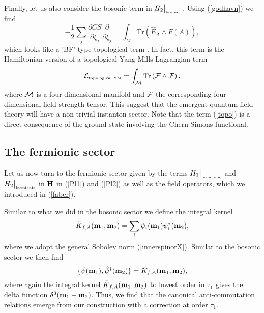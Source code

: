 \documentclass[12pt]{article}
\def\d{\delta}
\def\cf{{\cal F}}
\def\cl{{\cal L}}
\def\cm{{\cal M}}
\newcommand{\pa}{\partial}
\begin{document}
Finally, let us also consider the bosonic term in $H_2\big\vert_{\mbox{\tiny bosonic}}$.  Using (\ref{godhavn})  we find
\begin{equation}
-\frac{1}{2}\sum_j \frac{\pa CS}{\pa \xi_j}   \frac{\pa }{\pa \xi_j}  = \int_M \mbox{Tr} \left( \hat{E}_A \wedge F(A) \right),
\label{topo}
\end{equation}
which looks like a 'BF'-type topological term \cite{Birmingham}. In fact, this term is the Hamiltonian version of a topological Yang-Mills Lagrangian term \cite{Witten:1988ze} 
$$
\cl_{\mbox{\tiny topological YM}} = \int_{\cm}\mbox{Tr} \left( \cf \wedge \cf \right),
$$
where $\cm$ is a four-dimensional manifold and $\cf$ the corresponding four-dimensional field-strength tensor. This suggest that the emergent quantum field theory will have a non-trivial instanton sector. Note that the term (\ref{topo}) is a direct consequence of the ground state involving the Chern-Simons functional. 





\subsection{The fermionic sector }


Let us now turn to the fermionic sector given by the terms $H_1\big\vert_{\mbox{\tiny fermionic}}$ and $H_2\big\vert_{\mbox{\tiny fermionic}}$ in ${\bf H}$ in (\ref{Pl1}) and (\ref{Pl2}) as well as the field operators, which we introduced in (\ref{faber}). 

Similar to what we did in the bosonic sector we define the integral kernel
\begin{equation}
\tilde{K}_{f,A}({\bf m}_1,{\bf m}_2)= \sum_i \psi_i({\bf m}_1)\psi^*_i({\bf m}_2),
\label{Capetown}
\end{equation}
where we adopt the general Sobolev norm (\ref{innerspinorX}). Similar to the bosonic sector  we then find
\begin{equation}
\{ \hat{\psi} ({\bf m}_1) ,   \hat{{\psi}}^\dagger ({\bf m}_2) \} = \tilde{K}_{f,A}({\bf m}_1,{\bf m}_2),
\label{Fermionic}
\end{equation}
where again the integral kernel $\tilde{K}_{f,A}({\bf m}_1,{\bf m}_2)$ to lowest order in $\tau_1$ gives the delta function $\d^3({\bf m}_1-{\bf m}_2)$. Thus, we find that the canonical anti-commutation relations emerge from our construction with a correction at order $\tau_1$.
\end{document}
